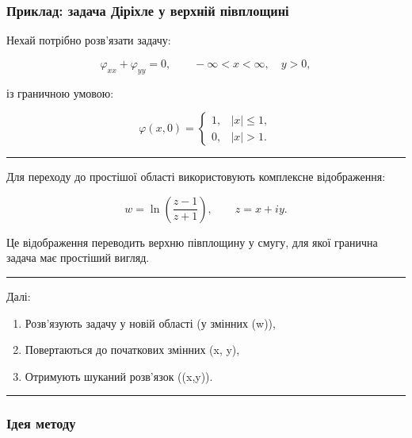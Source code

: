 \documentclass[
  ukrainian,
]{article}
\providecommand{\tightlist}{%
  \setlength{\itemsep}{0pt}\setlength{\parskip}{0pt}}
\begin{document}
\subsubsection{Приклад: задача Діріхле у верхній
півплощині}\label{ux43fux440ux438ux43aux43bux430ux434-ux437ux430ux434ux430ux447ux430-ux434ux456ux440ux456ux445ux43bux435-ux443-ux432ux435ux440ux445ux43dux456ux439-ux43fux456ux432ux43fux43bux43eux449ux438ux43dux456}

Нехай потрібно розв'язати задачу:

\[
\varphi_{xx} + \varphi_{yy} = 0, \qquad -\infty < x < \infty,\quad y > 0,
\]

із граничною умовою:

\[
\varphi(x,0) =
\begin{cases}
1, & |x| \le 1, \\
0, & |x| > 1.
\end{cases}
\]

\begin{center}\rule{0.5\linewidth}{0.5pt}\end{center}

Для переходу до простішої області використовують комплексне
відображення:

\[
w = \ln\!\left(\frac{z - 1}{z + 1}\right), \qquad z = x + iy.
\]

Це відображення переводить верхню півплощину у смугу, для якої гранична
задача має простіший вигляд.

\begin{center}\rule{0.5\linewidth}{0.5pt}\end{center}

Далі:

\begin{enumerate}
\def\labelenumi{\arabic{enumi}.}
\tightlist
\item
  Розв'язують задачу у новій області (у змінних (w)),
\item
  Повертаються до початкових змінних (x, y),
\item
  Отримують шуканий розв'язок (\varphi(x,y)).
\end{enumerate}

\begin{center}\rule{0.5\linewidth}{0.5pt}\end{center}

\subsubsection{Ідея
методу}\label{ux456ux434ux435ux44f-ux43cux435ux442ux43eux434ux443}
\end{document}
